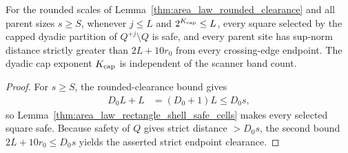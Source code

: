 \begin{lemma}
    \label{thm:area_law_rounded_safe_shell_cells}
    \leanok
    For the rounded scales of
    Lemma~\ref{thm:area_law_rounded_clearance} and all parent sizes
    $s\ge S$, whenever $j\le L$ and $2^{K_{\rm cap}}\le L$, every square selected
    by the capped dyadic partition of $Q^{+j}\setminus Q$ is safe, and
    every parent site has sup-norm distance strictly greater than
    $2L+10r_0$ from every crossing-edge endpoint.
    The dyadic cap exponent $K_{\rm cap}$ is independent of the scanner band count.
\end{lemma}
\begin{proof}\leanok
    For $s\ge S$, the rounded-clearance bound gives
    \begin{align}
        D_0L+L & =(D_0+1)L\le D_0s,
    \end{align}
    so Lemma~\ref{thm:area_law_rectangle_shell_safe_cells} makes every
    selected square safe. Because safety of $Q$ gives strict distance
    $>D_0s$, the second bound $2L+10r_0\le D_0s$ yields the asserted
    strict endpoint clearance.
\end{proof}
